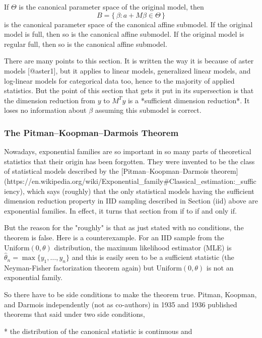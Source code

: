 \documentclass[11pt]{article}
\begin{document}
If $\Theta$ is the canonical parameter space of the original model, then
$$
   B = \{\, \beta : a + M \beta \in \Theta \,\}
$$
is the canonical parameter space of the canonical affine submodel.
If the original model is full, then so is the canonical affine submodel.
If the original model is regular full, then so is the canonical affine submodel.

There are many points to this section.  It is written the way it is because
of aster models [@aster1], but it applies
to linear models, generalized linear models, and log-linear models for
categorical data too, hence to the majority of applied statistics.
But the point of this section that gets it put in its supersection
is that the dimension reduction from $y$ to $M^T y$
is a *sufficient dimension reduction*.
It loses no information about $\beta$ assuming this submodel is correct.

\subsubsection{The Pitman–Koopman–Darmois Theorem}

Nowadays, exponential families are so important in so many parts
of theoretical statistics that their origin has been forgotten.
They were invented to be the class of statistical models described
by the [Pitman–Koopman–Darmois theorem](https://en.wikipedia.org/wiki/Exponential_family#Classical_estimation:_sufficiency), which says (roughly) that
the only statistical models having the sufficient dimension reduction property
in IID sampling described in Section \@ref(iid) above are exponential families.
In effect, it turns that section from if to if and only if.

But the reason for the "roughly" is that as just stated with no conditions,
the theorem is false.  Here is a counterexample.
For an IID sample from the $\text{Uniform}(0, \theta)$ distribution,
the maximum likelihood estimator (MLE)
is $\hat{\theta}_n = \max\{y_1, \ldots, y_n\}$
and this is easily seen to be a sufficient statistic (the Neyman-Fisher
factorization theorem again) but $\text{Uniform}(0, \theta)$ is not an
exponential family.

So there have to be side conditions to make the theorem true.
Pitman, Koopman, and Darmois independently (not as co-authors) in 1935 and 1936
published theorems that said under two side conditions,

 * the distribution of the canonical statistic is continuous and
\end{document}
